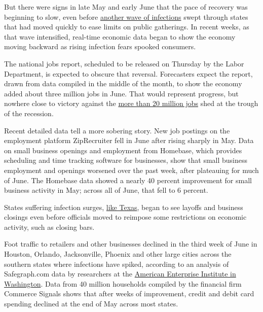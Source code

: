But there were signs in late May and early June that the pace of
recovery was beginning to slow, even before
\href{https://www.nytimes.com/interactive/2020/us/coronavirus-us-cases.html}{another
wave of infections} swept through states that had moved quickly to ease
limits on public gatherings. In recent weeks, as that wave intensified,
real-time economic data began to show the economy moving backward as
rising infection fears spooked consumers.

The national jobs report, scheduled to be released on Thursday by the
Labor Department, is expected to obscure that reversal. Forecasters
expect the report, drawn from data compiled in the middle of the month,
to show the economy added about three million jobs in June. That would
represent progress, but nowhere close to victory against the
\href{https://www.nytimes.com/interactive/2020/05/08/business/economy/april-jobs-report.html}{more
than 20 million jobs} shed at the trough of the recession.

Recent detailed data tell a more sobering story. New job postings on the
employment platform ZipRecruiter fell in June after rising sharply in
May. Data on small business openings and employment from Homebase, which
provides scheduling and time tracking software for businesses, show that
small business employment and openings worsened over the past week,
after plateauing for much of June. The Homebase data showed a nearly 40
percent improvement for small business activity in May; across all of
June, that fell to 6 percent.

States suffering infection surges,
\href{https://www.nytimes.com/2020/06/25/business/economy/texas-economy-oil-coronavirus.html}{like
Texas}, began to see layoffs and business closings even before officials
moved to reimpose some restrictions on economic activity, such as
closing bars.

Foot traffic to retailers and other businesses declined in the third
week of June in Houston, Orlando, Jacksonville, Phoenix and other large
cities across the southern states where infections have spiked,
according to an analysis of Safegraph.com data by researchers at the
\href{https://www.aei.org/wp-content/uploads/2020/06/Nowcast-Reopening-of-Metro-Area-Economies-week-25-FINAL.pdf}{American
Enterprise Institute in Washington}. Data from 40 million households
compiled by the financial firm Commerce Signals shows that after weeks
of improvement, credit and debit card spending declined at the end of
May across most states.

